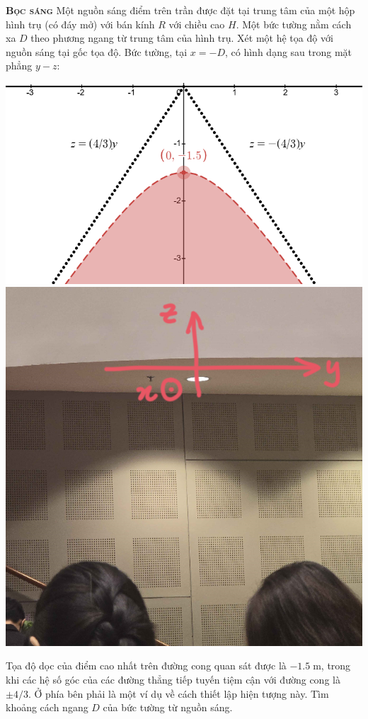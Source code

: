

\begin{problem}
	{\textbf{\textsc{Bọc sáng}}} 
	Một nguồn sáng điểm trên trần được đặt tại trung tâm của một hộp hình trụ (có đáy mở) với bán kính $R$ với chiều cao $H$. Một bức tường nằm cách xa $D$ theo phương ngang từ trung tâm của hình trụ. Xét một hệ tọa độ với nguồn sáng tại gốc tọa độ. Bức tường, tại $x=-D$, có hình dạng sau trong mặt phẳng $y-z$:
	
	\begin{center}
		\includegraphics[height=0.3\textwidth]{problems/figures/lightConeGraph.png}
		\hspace{2em}
		\includegraphics[height=0.3\textwidth]{problems/figures/lightConeHyperbola.png}
	\end{center}
	
	Tọa độ dọc của điểm cao nhất trên đường cong quan sát được là $-1.5\;\mathrm{m}$, trong khi các hệ số góc của các đường thẳng tiếp tuyến tiệm cận với đường cong là $\pm 4/3$. Ở phía bên phải là một ví dụ về cách thiết lập hiện tượng này. Tìm khoảng cách ngang $D$ của bức tường từ nguồn sáng.
\end{problem}
